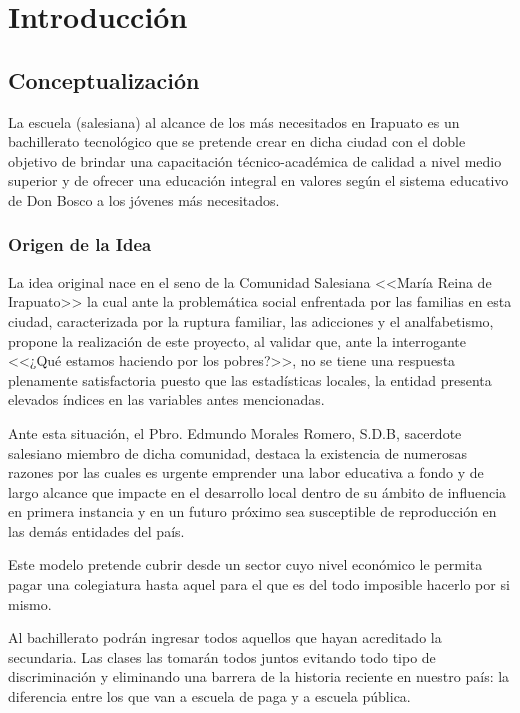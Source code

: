 \chapter{Introducción}
\label{ch:Introduccion}

\section{Conceptualización}

La escuela (salesiana) al alcance de los más necesitados en Irapuato es un bachillerato tecnológico que se pretende crear en dicha ciudad con el doble objetivo de brindar una capacitación técnico-académica de calidad a nivel medio superior y de ofrecer una educación integral en valores según el sistema educativo de Don Bosco a los jóvenes más necesitados.

\subsection{Origen de la Idea}
\label{sub:intro:OrigenIdea}

La idea original nace en el seno de la Comunidad Salesiana <<María Reina de Irapuato>> la cual ante la problemática social enfrentada por las familias en esta ciudad, caracterizada por la ruptura familiar, las adicciones y el analfabetismo, propone la realización de este proyecto, al validar que, ante la interrogante <<¿Qué estamos haciendo por los pobres?>>, no se tiene una respuesta plenamente satisfactoria puesto que las estadísticas locales, la entidad presenta elevados índices en las variables antes mencionadas.\citep{Morales09}

Ante esta situación, el Pbro. Edmundo Morales Romero, S.D.B, sacerdote salesiano miembro de dicha comunidad, destaca la existencia de numerosas razones por las cuales es urgente emprender una labor educativa a fondo y de largo alcance que impacte en el desarrollo local dentro de su ámbito de influencia en primera instancia y en un futuro próximo sea susceptible de reproducción en las demás entidades del país.

Este modelo pretende cubrir desde un sector cuyo nivel económico le permita pagar una colegiatura hasta aquel para el que es del todo imposible hacerlo por si mismo.

Al bachillerato podrán ingresar todos aquellos que hayan acreditado la secundaria. Las clases las tomarán todos juntos evitando todo tipo de discriminación y eliminando una barrera de la historia reciente en nuestro país: la diferencia entre los que van a escuela de paga y a escuela pública.

